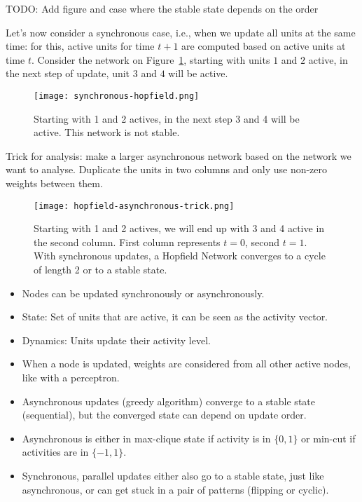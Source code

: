 \documentclass[main]{subfiles}
\begin{document}
TODO: Add figure and case where the stable state depends on the order

Let's now consider a synchronous case, i.e., when we update all units at the same time: for this, active units for time $t+1$ are computed based on active units at time $t$.
Consider the network on Figure~\ref{fig:synchronous-hopfield}, starting with units $1$ and $2$ active, in the next step of update, unit $3$ and $4$ will be active.

\begin{figure}[H]
	\label{fig:synchronous-hopfield}
	\centering
	\texttt{[image: synchronous-hopfield.png]}
	\caption{Starting with 1 and 2 actives, in the next step 3 and 4 will be active. This network is not stable.}
\end{figure}

Trick for analysis: make a larger asynchronous network based on the network we want to analyse. Duplicate the units in two columns and only use non-zero weights between them.

\begin{figure}[H]
	\centering
	\texttt{[image: hopfield-asynchronous-trick.png]}
	\caption{Starting with 1 and 2 actives, we will end up with 3 and 4 active in the second column. First column represents $t=0$, second $t=1$. With synchronous updates, a Hopfield Network converges to a cycle of length 2 or to a stable state.}
\end{figure}

\begin{itemize}[noitemsep,nolistsep]
	\item Nodes can be updated synchronously or asynchronously.
	\item State: Set of units that are active, it can be seen as the activity vector.
	\item Dynamics: Units update their activity level.
	\item When a node is updated, weights are considered from all other active nodes, like with a perceptron.
	\item Asynchronous updates (greedy algorithm) converge to a stable state (sequential), but the converged state can depend on update order.
	\item Asynchronous is either in max-clique state if activity is in $\{0,1\}$ or min-cut if activities are in $\{-1,1\}$.
	\item Synchronous, parallel updates either also go to a stable state, just like asynchronous, or can get stuck in a pair of patterns (flipping or cyclic).
\end{itemize}
\end{document}
